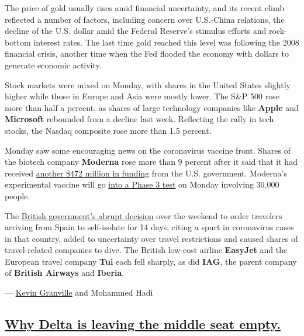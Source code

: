 The price of gold usually rises amid financial uncertainty, and its
recent climb reflected a number of factors, including concern over
U.S.-China relations, the decline of the U.S. dollar amid the Federal
Reserve's stimulus efforts and rock-bottom interest rates. The last time
gold reached this level was following the 2008 financial crisis, another
time when the Fed flooded the economy with dollars to generate economic
activity.

Stock markets were mixed on Monday, with shares in the United States
slightly higher while those in Europe and Asia were mostly lower. The
S\&P 500 rose more than half a percent, as shares of large technology
companies like \textbf{Apple} and \textbf{Microsoft} rebounded from a
decline last week. Reflecting the rally in tech stocks, the Nasdaq
composite rose more than 1.5 percent.

Monday saw some encouraging news on the coronavirus vaccine front.
Shares of the biotech company \textbf{Moderna} rose more than 9 percent
after it said that it had received
\href{https://www.nytimes.com/reuters/2020/07/27/us/27reuters-health-coronavirus-moderna.html}{another
\$472 million in funding} from the U.S. government. Moderna's
experimental vaccine will go
\href{https://www.nytimes.com/2020/07/14/health/cornavirus-vaccine-moderna.html}{into
a Phase 3 test} on Monday involving 30,000 people.

The
\href{https://www.nytimes.com/2020/07/26/world/europe/Spain-quarantine-UK-travel.html}{British
government's abrupt decision} over the weekend to order travelers
arriving from Spain to self-isolate for 14 days, citing a spurt in
coronavirus cases in that country, added to uncertainty over travel
restrictions and caused shares of travel-related companies to dive. The
British low-cost airline \textbf{EasyJet} and the European travel
company \textbf{Tui} each fell sharply, as did \textbf{IAG}, the parent
company of \textbf{British Airways} and \textbf{Iberia}.

--- \href{https://www.nytimes.com/by/kevin-granville}{Kevin Granville}
and Mohammed Hadi

\hypertarget{why-delta-is-leaving-the-middle-seat-empty}{%
\subsection{\texorpdfstring{\protect\hyperlink{why-delta-is-leaving-the-middle-seat-empty}{Why
Delta is leaving the middle seat
empty.}}{Why Delta is leaving the middle seat empty.}}\label{why-delta-is-leaving-the-middle-seat-empty}}

